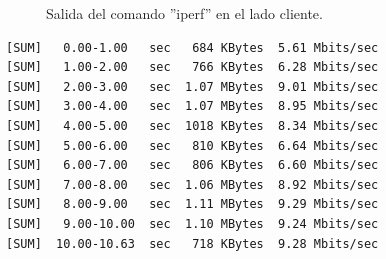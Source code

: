 \begin{figure}[H]
    \centering
    \hspace{1.5cm}
    \caption{Salida del comando ''iperf'' en el lado cliente.}
\end{figure}

\begin{lstlisting}[caption={Salida del comando ''iperf'' en el lado cliente.}]
[SUM]   0.00-1.00   sec   684 KBytes  5.61 Mbits/sec 
[SUM]   1.00-2.00   sec   766 KBytes  6.28 Mbits/sec 
[SUM]   2.00-3.00   sec  1.07 MBytes  9.01 Mbits/sec     
[SUM]   3.00-4.00   sec  1.07 MBytes  8.95 Mbits/sec 
[SUM]   4.00-5.00   sec  1018 KBytes  8.34 Mbits/sec 
[SUM]   5.00-6.00   sec   810 KBytes  6.64 Mbits/sec 
[SUM]   6.00-7.00   sec   806 KBytes  6.60 Mbits/sec
[SUM]   7.00-8.00   sec  1.06 MBytes  8.92 Mbits/sec 
[SUM]   8.00-9.00   sec  1.11 MBytes  9.29 Mbits/sec  
[SUM]   9.00-10.00  sec  1.10 MBytes  9.24 Mbits/sec 
[SUM]  10.00-10.63  sec   718 KBytes  9.28 Mbits/sec 
\end{lstlisting}

